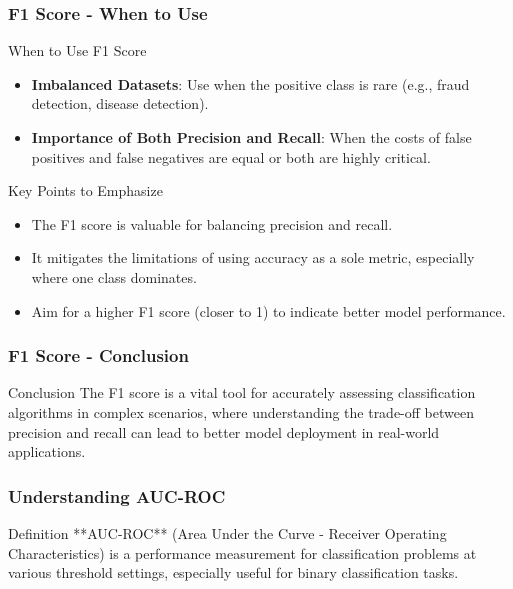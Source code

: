\documentclass[aspectratio=169]{beamer}
\begin{document}
\begin{frame}[fragile]
    \frametitle{F1 Score - When to Use}
    \begin{block}{When to Use F1 Score}
        \begin{itemize}
            \item \textbf{Imbalanced Datasets}: Use when the positive class is rare (e.g., fraud detection, disease detection).
            \item \textbf{Importance of Both Precision and Recall}: When the costs of false positives and false negatives are equal or both are highly critical.
        \end{itemize}
    \end{block}

    \begin{block}{Key Points to Emphasize}
        \begin{itemize}
            \item The F1 score is valuable for balancing precision and recall.
            \item It mitigates the limitations of using accuracy as a sole metric, especially where one class dominates.
            \item Aim for a higher F1 score (closer to 1) to indicate better model performance.
        \end{itemize}
    \end{block}
\end{frame}

\begin{frame}[fragile]
    \frametitle{F1 Score - Conclusion}
    \begin{block}{Conclusion}
        The F1 score is a vital tool for accurately assessing classification algorithms in complex scenarios,
        where understanding the trade-off between precision and recall can lead to better model deployment in real-world applications.
    \end{block}
\end{frame}

\begin{frame}
    \titlepage
\end{frame}

\begin{frame}
    \frametitle{Understanding AUC-ROC}
    \begin{block}{Definition}
        **AUC-ROC** (Area Under the Curve - Receiver Operating Characteristics) is a performance measurement for classification problems at various threshold settings, especially useful for binary classification tasks.
    \end{block}
\end{frame}
\end{document}
